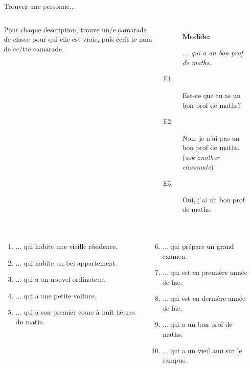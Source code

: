 \begin{frame}{Trouvez une personne...}
  \begin{columns}
      Pour chaque description, trouve un/e camarade de classe pour qui elle est vraie, puis écris le nom de ce/tte camarade. \\
      {\scriptsize
      \begin{description}
        \item[] \textbf{Modèle:}
        \item[] \emph{... qui a un bon prof de maths.}
        \item[E1:] Est-ce que tu as un bon prof de maths?
        \item[] 
        \item[E2:] Non, je n'ai pas un bon prof de maths. (\emph{ask another classmate})
        \item[] 
        \item[E3:] Oui, j'ai un bon prof de maths.
        \item[] 
      \end{description}
      }
  \end{columns}
  \vspace{0.5cm}
  {\scriptsize
  \begin{columns}[t]
      \begin{enumerate}
        \item ... qui habite une vieille résidence.
        \item ... qui habite un bel appartement.
        \item ... qui a un nouvel ordinateur.
        \item ... qui a une petite voiture.
        \item ... qui a son premier cours à huit heures du matin.
      \end{enumerate}
      \begin{enumerate}
        \setcounter{enumi}{5}
        \item ... qui prépare un grand examen.
        \item ... qui est en première année de fac.
        \item ... qui est en dernière année de fac.
        \item ... qui a un bon prof de maths.
        \item ... qui a un vieil ami sur le campus.
      \end{enumerate}
  \end{columns}
  }
\end{frame}